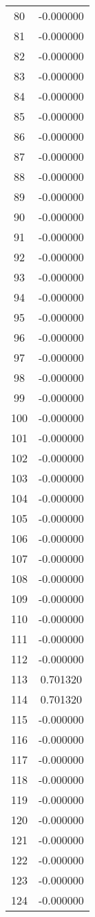 \documentclass[12pt]{article}
\begin{document}
\begin{longtable}{@{}cc@{}}
80 & -0.000000 \\
81 & -0.000000 \\
82 & -0.000000 \\
83 & -0.000000 \\
84 & -0.000000 \\
85 & -0.000000 \\
86 & -0.000000 \\
87 & -0.000000 \\
88 & -0.000000 \\
89 & -0.000000 \\
90 & -0.000000 \\
91 & -0.000000 \\
92 & -0.000000 \\
93 & -0.000000 \\
94 & -0.000000 \\
95 & -0.000000 \\
96 & -0.000000 \\
97 & -0.000000 \\
98 & -0.000000 \\
99 & -0.000000 \\
100 & -0.000000 \\
101 & -0.000000 \\
102 & -0.000000 \\
103 & -0.000000 \\
104 & -0.000000 \\
105 & -0.000000 \\
106 & -0.000000 \\
107 & -0.000000 \\
108 & -0.000000 \\
109 & -0.000000 \\
110 & -0.000000 \\
111 & -0.000000 \\
112 & -0.000000 \\
113 & 0.701320 \\
114 & 0.701320 \\
115 & -0.000000 \\
116 & -0.000000 \\
117 & -0.000000 \\
118 & -0.000000 \\
119 & -0.000000 \\
120 & -0.000000 \\
121 & -0.000000 \\
122 & -0.000000 \\
123 & -0.000000 \\
124 & -0.000000 \\

\end{longtable}
\end{document}
